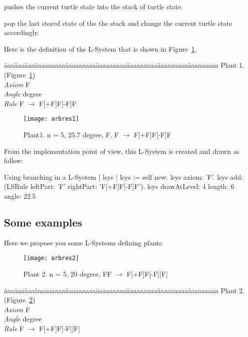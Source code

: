 \begin{description}
\item{\ct{[}} pushes the current turtle state into the stack of turtle state.
\item{\ct{]}} pop the last stored state of the the stack and change the current turtle state accordingly. 
\end{description}

Here is the definition of the L-System that is shown in
Figure~\ref{fig:arbres1}.

\begin{tabbing}
\=aaa\=aaa\=aaa\=aaaaaaaaa\=aaaaaaaaa\=aaaaaaaaa\=aaaaaaaaa\=aaaaaaaaa\=aaaaaaaaa\kill
Plant 1. (Figure~\ref{fig:arbres1})\\
\>\>\>\> \emph{Axiom} \>\>F\\
\>\>\>\> \emph{Angle} \> degree\\
\>\>\>\> \emph{Rule}  \>\>F $\rightarrow$ F[+F]F[-F]F
\end{tabbing}

\begin{figure}
\centerline{\texttt{[image: arbres1]}}
\caption{Plant1. n = 5, 25.7 degree, F, F $\rightarrow$ F[+F]F[-F]F}
\label{fig:arbres1}
\end{figure}

From the implementation point of view, this L-System is created and
drawn as follow:

\begin{scriptwithtitle}{Using branching in a L-System}
| lsys |
lsys := self new.
lsys axiom: 'F'.
lsys add: (LSRule leftPart: 'F' rightPart: 'F[+F]F[-F]F').
lsys drawAtLevel: 4 length: 6 angle: 22.5
\end{scriptwithtitle}


\subsection{Some examples}
Here we propose you some L-Systems defining plants. 

\begin{figure}
\centerline{\texttt{[image: arbres2]}}
\caption{Plant 2. n = 5, 20 degree, F\newline F $\rightarrow$ F[+F]F[-F][F]}
\label{fig:arbres2}
\end{figure}


\begin{tabbing}
\=aaa\=aaa\=aaa\=aaaaaaaaa\=aaaaaaaaa\=aaaaaaaaa\=aaaaaaaaa\=aaaaaaaaa\=aaaaaaaaa\kill
Plant 2. (Figure~\ref{fig:arbres2})\\ 
\>\>\>\> \emph{Axiom} \>\>F\\
\>\>\>\> \emph{Angle} \> degree\\
\>\>\>\> \emph{Rule}  \>\>F $\rightarrow$ F[+F]F[-F][F]
\end{tabbing}


